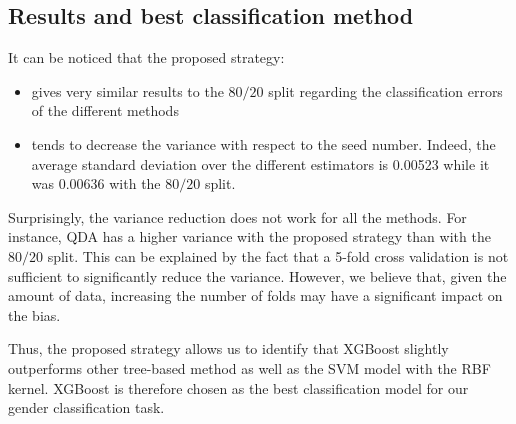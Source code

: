 \subsection{Results and best classification method}
It can be noticed that the proposed strategy:
\begin{itemize}
	\item gives very similar results to the $80/20$ split regarding the classification errors of the different methods
 	\item tends to decrease the variance with respect to the seed number. Indeed, the average standard deviation over the different estimators is \num{0.00523} while it was \num{0.00636} with the $80/20$ split.
\end{itemize} 

Surprisingly, the variance reduction does not work for all the methods. For instance, QDA has a higher variance with the proposed strategy than with the $80/20$ split. 
This can be explained by the fact that a \num{5}-fold cross validation is not sufficient to significantly reduce the variance. However, we believe that, given the amount of data, increasing the number of folds may have a significant impact on the bias. 

Thus, the proposed strategy allows us to identify that XGBoost slightly outperforms other tree-based method as well as the SVM model with the RBF kernel. XGBoost is therefore chosen as the best classification model for our gender classification task. 
